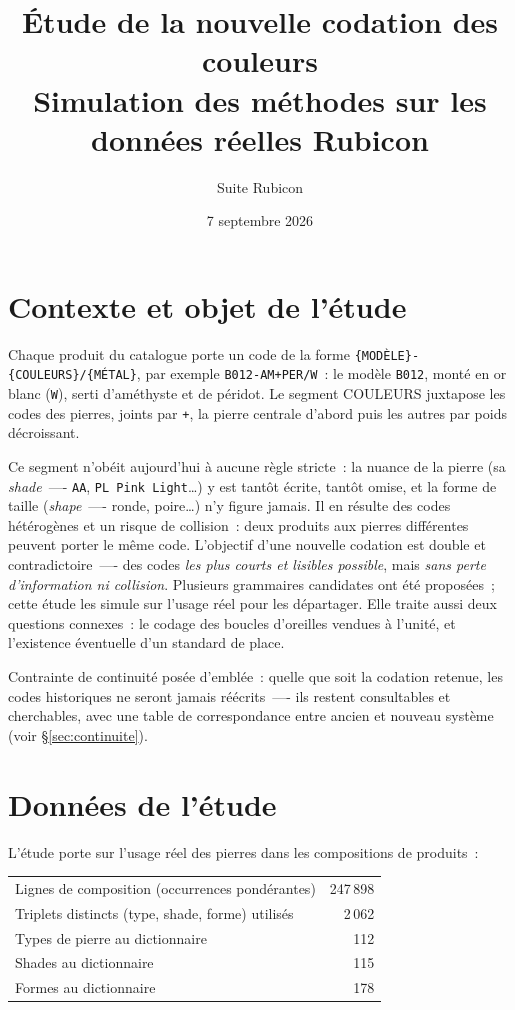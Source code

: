 \documentclass[11pt,a4paper]{article}
\title{Étude de la nouvelle codation des couleurs\\[2pt]
\large Simulation des méthodes sur les données réelles Rubicon}
\author{Suite Rubicon}
\date{7 septembre 2026}
\newcommand{\code}[1]{\texttt{#1}}
\begin{document}
\maketitle

\section{Contexte et objet de l'étude}

Chaque produit du catalogue porte un code de la forme
\code{\{MODÈLE\}-\{COULEURS\}/\{MÉTAL\}}, par exemple
\code{B012-AM+PER/W}~: le modèle \code{B012}, monté en or blanc
(\code{W}), serti d'améthyste et de péridot. Le segment COULEURS juxtapose
les codes des pierres, joints par \code{+}, la pierre centrale d'abord puis
les autres par poids décroissant.

Ce segment n'obéit aujourd'hui à aucune règle stricte~: la nuance de la
pierre (sa \emph{shade}~—- \code{AA}, \code{PL Pink Light}\ldots) y est
tantôt écrite, tantôt omise, et la forme de taille (\emph{shape}~—- ronde,
poire\ldots) n'y figure jamais. Il en résulte des codes hétérogènes et un
risque de collision~: deux produits aux pierres différentes peuvent porter
le même code. L'objectif d'une nouvelle codation est double et
contradictoire~—- des codes \emph{les plus courts et lisibles possible},
mais \emph{sans perte d'information ni collision}. Plusieurs grammaires
candidates ont été proposées~; cette étude les simule sur l'usage réel pour
les départager. Elle traite aussi deux questions connexes~: le codage des
boucles d'oreilles vendues à l'unité, et l'existence éventuelle d'un
standard de place.

Contrainte de continuité posée d'emblée~: quelle que soit la codation
retenue, les codes historiques ne seront jamais réécrits~—- ils restent
consultables et cherchables, avec une table de correspondance entre ancien
et nouveau système (voir §\ref{sec:continuite}).

\section{Données de l'étude}

L'étude porte sur l'usage réel des pierres dans les compositions de produits~:

\begin{center}
\begin{tabular}{lr}
\toprule
Lignes de composition (occurrences pondérantes) & 247\,898 \\
Triplets distincts (type, shade, forme) utilisés & 2\,062 \\
Types de pierre au dictionnaire & 112 \\
Shades au dictionnaire & 115 \\
Formes au dictionnaire & 178 \\
\bottomrule
\end{tabular}
\end{center}
\end{document}

